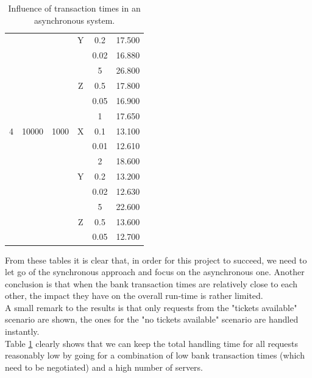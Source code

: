 \documentclass[conference]{IEEEtran}
\begin{document}
\begin{table}[!t]
{\begin{tabular}{c|c|c|c|c|c}
			&	 								& 								  & Y				   & 0.2 					   & 17.500\\
			&									& 								  &						& 0.02 					   & 16.880 \\\hline
			&									& 								  &				   		& 5 						 & 26.800 \\
			&	 								& 								  & Z				   & 0.5 					   & 17.800\\
			&									& 								  &						& 0.05 					   & 16.900\\\hline
			&  					  			&  								  & 					& 1 						 & 17.650 \\
			4								&	10000 					  & 1000						& X					 & 0.1 						 & 13.100 \\
			&									& 								  &						& 0.01 					   & 12.610 \\\hline
			&									& 								  &				   		& 2 						 & 18.600 \\
			&	 								& 								  & Y				   & 0.2 					   & 13.200\\
			&									& 								  &						& 0.02 					   & 12.630 \\\hline
			&									& 								  &				   		& 5 						 & 22.600 \\
			&	 								& 								  & Z				   & 0.5 					   & 13.600\\
			&									& 								  &						& 0.05 					   & 12.700\\
	\end{tabular}}
	\caption{\label{tab:banking-time-influence-asynchronous}Influence of transaction times in an asynchronous system.}
\end{table}\noindent
From these tables it is clear that, in order for this project to succeed, we need to let go of the synchronous approach and focus on the asynchronous one. Another conclusion is that when the bank transaction times are relatively close to each other, the impact they have on the overall run-time is rather limited.\\
A small remark to the results is that only requests from the "tickets available" scenario are shown, the ones for the "no tickets available" scenario are handled instantly.\\
Table \ref{tab:banking-time-influence-asynchronous} clearly shows that we can keep the total handling time for all requests reasonably low by going for a combination of low bank transaction times (which need to be negotiated) and a high number of servers.
\end{document}

